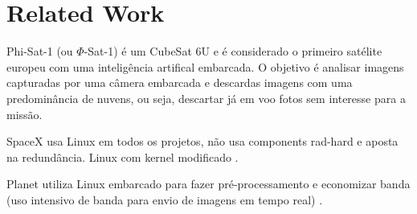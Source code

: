 %
%
%
%
%

%
%
%
%
%

\section{Related Work} \label{sec:related-work}

\cite{cosmas2020}

\cite{mateo-garcia2021}

Phi-Sat-1 (ou $\Phi$-Sat-1) \cite{phi-sat-1} é um CubeSat 6U e é considerado o primeiro satélite europeu com uma inteligência artifical embarcada. O objetivo é analisar imagens capturadas por uma câmera embarcada e descardas imagens com uma predominância de nuvens, ou seja, descartar já em voo fotos sem interesse para a missão.

SpaceX usa Linux em todos os projetos, não usa components rad-hard e aposta na redundância. Linux com kernel modificado \cite{leppinen2017}.

Planet utiliza Linux embarcado para fazer pré-processamento e economizar banda (uso intensivo de banda para envio de imagens em tempo real) \cite{leppinen2017}.
